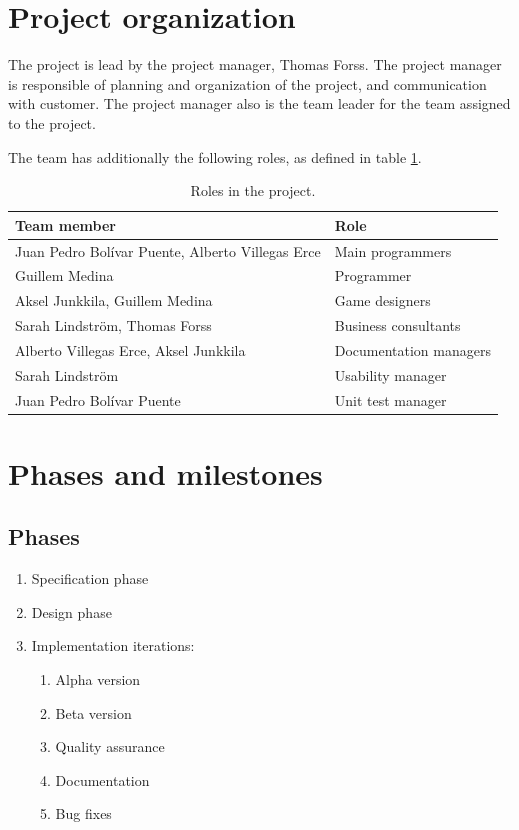 \documentclass[12pt,a4paper]{article}
\begin{document}
\section{Project organization}

The project is lead by the project manager, Thomas Forss. The project
manager is responsible of planning and organization of the project,
and communication with customer. The project manager also is the team
leader for the team assigned to the project.

The team has additionally the following roles, as defined in table
\ref{tab:roles}.

\begin{table}[h!]
\small
\begin{tabular}{l|l}
Team member                                      &Role \\\hline\hline
Juan Pedro Bolívar Puente, Alberto Villegas Erce &Main programmers\\
Guillem Medina 					 &Programmer\\
Aksel Junkkila, Guillem Medina			 &Game designers\\		
Sarah Lindström, Thomas Forss			 &Business consultants\\
Alberto Villegas Erce, Aksel Junkkila		 &Documentation managers\\
Sarah Lindström					 &Usability manager\\
Juan Pedro Bolívar Puente			 &Unit test manager\\
\end{tabular}
\caption{Roles in the project.}
\label{tab:roles}
\end{table}

\section{Phases and milestones}

\subsection{Phases}
\begin{enumerate}
\item Specification phase
\item Design phase	
\item Implementation iterations:
\begin{enumerate}
\item Alpha version
\item Beta version
\item Quality assurance
\item Documentation
\item Bug fixes
\end{enumerate}
\end{enumerate}
\end{document}
